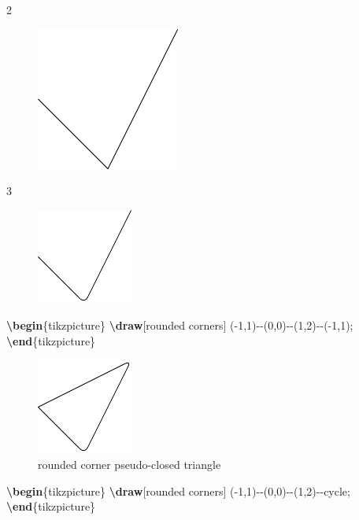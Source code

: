 \documentclass[
]{book}
\newenvironment{Shaded}{\begin{snugshade}}{\end{snugshade}}
\newcommand{\ExtensionTok}[1]{#1}
\newcommand{\FunctionTok}[1]{\textcolor[rgb]{0.13,0.29,0.53}{\textbf{#1}}}
\newcommand{\KeywordTok}[1]{\textcolor[rgb]{0.13,0.29,0.53}{\textbf{#1}}}
\newcommand{\NormalTok}[1]{#1}
\theoremstyle{definition}
\theoremstyle{definition}
\theoremstyle{definition}
\theoremstyle{definition}
\theoremstyle{remark}
\begin{document}
2

\begin{figure}
\includegraphics[width=0.15\linewidth]{202401311000-TikZ_files/figure-latex/unnamed-chunk-12-1} \end{figure}

3

\begin{figure}
\includegraphics[width=0.25\linewidth]{202401311000-TikZ_files/figure-latex/unnamed-chunk-13-1} \end{figure}

\begin{Shaded}
\begin{Highlighting}[]
\KeywordTok{\textbackslash{}begin}\NormalTok{\{}\ExtensionTok{tikzpicture}\NormalTok{\}}
  \FunctionTok{\textbackslash{}draw}\NormalTok{[rounded corners] ({-}1,1){-}{-}(0,0){-}{-}(1,2){-}{-}({-}1,1);}
\KeywordTok{\textbackslash{}end}\NormalTok{\{}\ExtensionTok{tikzpicture}\NormalTok{\}}
\end{Highlighting}
\end{Shaded}

\begin{figure}
\includegraphics[width=0.25\linewidth]{202401311000-TikZ_files/figure-latex/unnamed-chunk-15-1} \caption{rounded corner pseudo-closed triangle}\label{fig:unnamed-chunk-15}
\end{figure}

\begin{Shaded}
\begin{Highlighting}[]
\KeywordTok{\textbackslash{}begin}\NormalTok{\{}\ExtensionTok{tikzpicture}\NormalTok{\}}
  \FunctionTok{\textbackslash{}draw}\NormalTok{[rounded corners] ({-}1,1){-}{-}(0,0){-}{-}(1,2){-}{-}cycle;}
\KeywordTok{\textbackslash{}end}\NormalTok{\{}\ExtensionTok{tikzpicture}\NormalTok{\}}
\end{Highlighting}
\end{Shaded}
\end{document}
